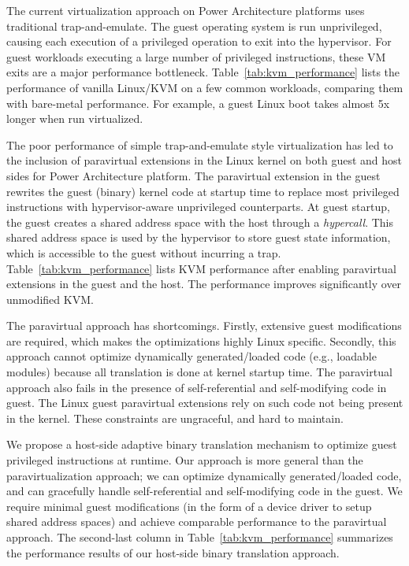\documentclass[10pt,twocolumn]{article}
\begin{document}
The current virtualization approach on Power Architecture platforms uses traditional
trap-and-emulate. The guest operating system is run unprivileged, causing each
execution of a privileged
operation to exit into the hypervisor. For guest workloads executing a large number
of privileged instructions, these VM exits are a major performance
bottleneck. Table~\ref{tab:kvm_performance} lists the performance of vanilla Linux/KVM
on a few common workloads, comparing them with bare-metal performance.
For example, a guest Linux boot takes almost 5x longer when run virtualized.

The poor performance of simple trap-and-emulate style virtualization has led to
the inclusion of paravirtual extensions in the Linux kernel on both
guest and host sides for Power Architecture platform\cite{pvpower}. The paravirtual extension in the guest
rewrites the guest (binary) kernel
code at startup time to replace most privileged instructions with
hypervisor-aware unprivileged counterparts.
At guest startup, the guest creates a shared address space with
the host through a {\em hypercall}. This shared address space
is used by the hypervisor to store guest state information, which
is accessible to the guest without incurring a trap.
Table~\ref{tab:kvm_performance} lists KVM performance after enabling paravirtual
extensions in the guest and the host. The performance improves significantly over
unmodified KVM.

The paravirtual approach has shortcomings. Firstly, extensive guest
modifications are required, which makes the optimizations highly Linux specific.
Secondly, this approach
cannot optimize dynamically generated/loaded code (e.g., loadable modules) because
all translation is done at kernel startup time.
The paravirtual approach also
fails in the presence of self-referential and self-modifying code in guest.
The Linux guest paravirtual extensions rely on such code not being present in the
kernel. These constraints are ungraceful, and hard to maintain.

We propose a host-side adaptive binary translation mechanism to optimize guest
privileged instructions at runtime. Our approach is more general than
the paravirtualization approach; we can optimize dynamically
generated/loaded code, and can gracefully handle
self-referential and self-modifying
code in the guest. We require minimal guest
modifications (in the form of a device driver to setup shared address spaces)
and achieve
comparable performance to the paravirtual approach.
The second-last column in Table~\ref{tab:kvm_performance} summarizes the performance results of
our host-side binary translation approach.
\end{document}
